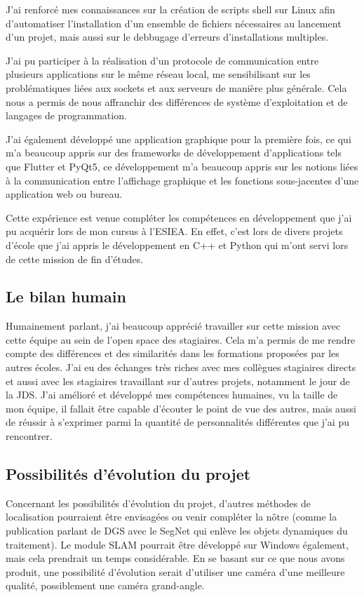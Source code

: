 \documentclass[11pt]{article}
\begin{document}
      J'ai renforcé mes connaissances sur la création de scripts shell sur Linux afin d'automatiser l'installation d'un ensemble de 
      fichiers nécessaires au lancement d'un projet, mais aussi sur le debbugage d'erreurs d'installations multiples.
    
      J'ai pu participer à la réalisation d'un protocole de communication entre plusieurs applications sur le même réseau local, me 
      sensibilisant sur les problématiques liées aux sockets et aux serveurs de manière plus générale.
      Cela nous a permis de nous affranchir des différences de système d'exploitation et de langages de programmation. 
      
      J'ai également développé une application graphique pour la première fois, ce qui m'a beaucoup appris sur des frameworks de 
      développement d'applications tels que Flutter et PyQt5, ce développement m'a beaucoup appris sur les notions liées 
      à la communication entre l'affichage graphique et les fonctions sous-jacentes d'une application web ou bureau.

      Cette expérience est venue compléter les compétences en développement que j'ai pu acquérir lors de mon cursus à l'ESIEA. En
      effet, c'est lors de divers projets d'école que j'ai appris le développement en C++ et Python qui m'ont servi lors de cette 
      mission de fin d'études.

    \subsection{Le bilan humain}
      Humainement parlant, j'ai beaucoup apprécié travailler sur cette mission avec cette équipe au sein de l'open space des
      stagiaires. Cela m'a permis de me rendre compte des différences et des similarités dans les formations proposées par les 
      autres écoles. J'ai eu des échanges très riches avec mes collègues stagiaires directs et aussi avec les stagiaires travaillant 
      sur d'autres projets, notamment le jour de la JDS.    
      J'ai amélioré et développé mes compétences humaines, vu la taille de mon équipe, il fallait être capable 
      d'écouter le point de vue des autres, mais aussi de réussir à s'exprimer parmi la quantité de personnalités 
      différentes que j'ai pu rencontrer.

    \pagebreak
    
    \subsection{Possibilités d'évolution du projet}
      Concernant les possibilités d'évolution du projet, d'autres méthodes de localisation pourraient être envisagées ou venir
      compléter la nôtre (comme la publication parlant de DGS avec le SegNet qui enlève les objets dynamiques du traitement).
      Le module SLAM pourrait être développé sur Windows également, mais cela prendrait un temps considérable. 
      En se basant sur ce que nous avons produit, une possibilité d'évolution serait d'utiliser une caméra d'une meilleure qualité, 
      possiblement une caméra grand-angle.  
\end{document}
